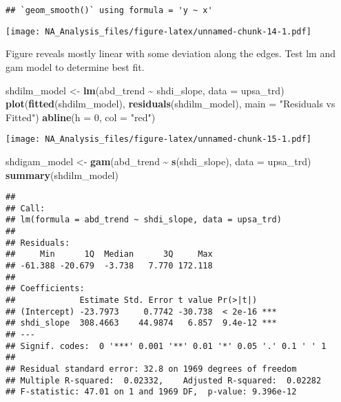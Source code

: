 \documentclass[
]{article}
\newenvironment{Shaded}{\begin{snugshade}}{\end{snugshade}}
\newcommand{\AttributeTok}[1]{\textcolor[rgb]{0.13,0.29,0.53}{#1}}
\newcommand{\DecValTok}[1]{\textcolor[rgb]{0.00,0.00,0.81}{#1}}
\newcommand{\FunctionTok}[1]{\textcolor[rgb]{0.13,0.29,0.53}{\textbf{#1}}}
\newcommand{\NormalTok}[1]{#1}
\newcommand{\OtherTok}[1]{\textcolor[rgb]{0.56,0.35,0.01}{#1}}
\newcommand{\SpecialCharTok}[1]{\textcolor[rgb]{0.81,0.36,0.00}{\textbf{#1}}}
\newcommand{\StringTok}[1]{\textcolor[rgb]{0.31,0.60,0.02}{#1}}
\begin{document}
\begin{verbatim}
## `geom_smooth()` using formula = 'y ~ x'
\end{verbatim}

\texttt{[image: NA\_Analysis\_files/figure-latex/unnamed-chunk-14-1.pdf]}

Figure reveals mostly linear with some deviation along the edges. Test
lm and gam model to determine best fit.

\begin{Shaded}
\begin{Highlighting}[]
\NormalTok{shdilm\_model }\OtherTok{\textless{}{-}} \FunctionTok{lm}\NormalTok{(abd\_trend }\SpecialCharTok{\textasciitilde{}}\NormalTok{ shdi\_slope, }\AttributeTok{data =}\NormalTok{ upsa\_trd)}
\FunctionTok{plot}\NormalTok{(}\FunctionTok{fitted}\NormalTok{(shdilm\_model), }\FunctionTok{residuals}\NormalTok{(shdilm\_model), }\AttributeTok{main =} \StringTok{"Residuals vs Fitted"}\NormalTok{)}
\FunctionTok{abline}\NormalTok{(}\AttributeTok{h =} \DecValTok{0}\NormalTok{, }\AttributeTok{col =} \StringTok{"red"}\NormalTok{)}
\end{Highlighting}
\end{Shaded}

\texttt{[image: NA\_Analysis\_files/figure-latex/unnamed-chunk-15-1.pdf]}

\begin{Shaded}
\begin{Highlighting}[]
\NormalTok{shdigam\_model }\OtherTok{\textless{}{-}} \FunctionTok{gam}\NormalTok{(abd\_trend }\SpecialCharTok{\textasciitilde{}} \FunctionTok{s}\NormalTok{(shdi\_slope), }\AttributeTok{data =}\NormalTok{ upsa\_trd)}
\FunctionTok{summary}\NormalTok{(shdilm\_model)}
\end{Highlighting}
\end{Shaded}

\begin{verbatim}
## 
## Call:
## lm(formula = abd_trend ~ shdi_slope, data = upsa_trd)
## 
## Residuals:
##     Min      1Q  Median      3Q     Max 
## -61.388 -20.679  -3.738   7.770 172.118 
## 
## Coefficients:
##             Estimate Std. Error t value Pr(>|t|)    
## (Intercept) -23.7973     0.7742 -30.738  < 2e-16 ***
## shdi_slope  308.4663    44.9874   6.857  9.4e-12 ***
## ---
## Signif. codes:  0 '***' 0.001 '**' 0.01 '*' 0.05 '.' 0.1 ' ' 1
## 
## Residual standard error: 32.8 on 1969 degrees of freedom
## Multiple R-squared:  0.02332,    Adjusted R-squared:  0.02282 
## F-statistic: 47.01 on 1 and 1969 DF,  p-value: 9.396e-12
\end{verbatim}
\end{document}
